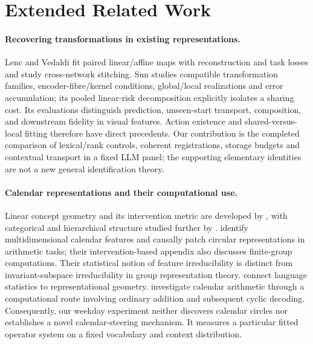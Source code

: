 \section{Extended Related Work}
\label{app:related-work}
\paragraph{Recovering transformations in existing representations.}
Lenc and Vedaldi \citeyearpar{lenc2015understanding} fit paired linear/affine maps with reconstruction and task losses and study cross-network stitching. Sun \citeyearpar{sun2026transformationlaws} studies compatible transformation families, encoder-fibre/kernel conditions, global/local realizations and error accumulation; its pooled linear-risk decomposition explicitly isolates a sharing cost. Its evaluations distinguish prediction, unseen-start transport, composition, and downstream fidelity in visual features. Action existence and shared-versus-local fitting therefore have direct precedents. Our contribution is the completed comparison of lexical/rank controls, coherent registrations, storage budgets and contextual transport in a fixed LLM panel; the supporting elementary identities are not a new general identification theory.

\paragraph{Calendar representations and their computational use.}
Linear concept geometry and its intervention metric are developed by \citet{park2023linear}, with categorical and hierarchical structure studied further by \citet{park2025categorical}. \citet{engels2025notall} identify multidimensional calendar features and causally patch circular representations in arithmetic tasks; their intervention-based appendix also discusses finite-group computations. Their statistical notion of feature irreducibility is distinct from invariant-subspace irreducibility in group representation theory. \citet{karkada2026emergent} connect language statistics to representational geometry. \citet{feucht2026arithmetic} investigate calendar arithmetic through a computational route involving ordinary addition and subsequent cyclic decoding. Consequently, our weekday experiment neither discovers calendar circles nor establishes a novel calendar-steering mechanism. It measures a particular fitted operator system on a fixed vocabulary and context distribution.


